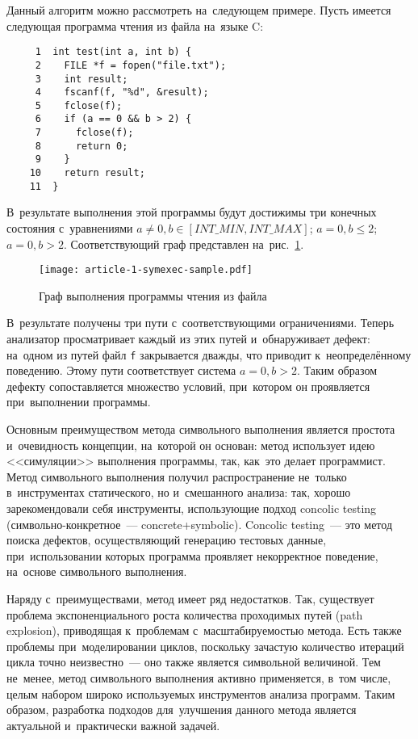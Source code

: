 Данный алгоритм можно рассмотреть на~следующем примере. Пусть имеется следующая программа чтения из файла на~языке C:

\begin{verbatim}
     1  int test(int a, int b) {
     2    FILE *f = fopen("file.txt");
     3    int result;
     4    fscanf(f, "%d", &result);
     5    fclose(f);
     6    if (a == 0 && b > 2) {
     7      fclose(f);
     8      return 0;
     9    }
    10    return result;
    11  }
\end{verbatim}

В~результате выполнения этой программы будут достижимы три конечных состояния с~уравнениями $a \neq 0, b \in [INT\_MIN, INT\_MAX]$; $a = 0, b \leqslant 2$; $a = 0, b > 2$. Соответствующий граф представлен на~рис.~\ref{pic:sample-exec}.

\begin{figure}
   \centering
   \texttt{[image: article-1-symexec-sample.pdf]}
   \caption{Граф выполнения программы чтения из файла}\label{pic:sample-exec}
\end{figure}

В~результате получены три пути с~соответствующими ограничениями. Теперь анализатор просматривает каждый из этих путей и~обнаруживает дефект: на~одном из путей файл \texttt{f} закрывается дважды, что приводит к~неопределённому поведению. Этому пути соответствует система $a = 0, b > 2$. Таким образом дефекту сопоставляется множество условий, при~котором он проявляется при~выполнении программы.

Основным преимуществом метода символьного выполнения является простота и~очевидность концепции, на~которой он основан: метод использует идею <<симуляции>> выполнения программы, так, как~это делает программист. Метод символьного выполнения получил распространение не~только в~инструментах статического, но и~смешанного анализа: так, хорошо зарекомендовали себя инструменты, использующие подход concolic testing \cite{concolic}  (символьно-конкретное~--- concrete+symbolic). Concolic testing~--- это метод поиска дефектов, осуществляющий генерацию тестовых данные, при~использовании которых программа проявляет некорректное поведение, на~основе символьного выполнения.

Наряду с~преимуществами, метод имеет ряд недостатков. Так, существует проблема экспоненциального роста количества проходимых путей (path explosion), приводящая к~проблемам с~масштабируемостью метода. Есть также проблемы при~моделировании циклов, поскольку зачастую количество итераций цикла точно неизвестно~--- оно также является символьной величиной. Тем не~менее, метод символьного выполнения активно применяется, в~том числе, целым набором широко используемых инструментов анализа программ. Таким образом, разработка подходов для~улучшения данного метода является актуальной и~практически важной задачей.

